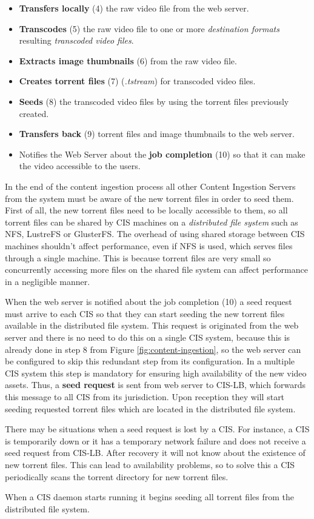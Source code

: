 \begin{itemize}
 \item \textbf{Transfers locally} (4) the raw video file from the web server.
 \item \textbf{Transcodes} (5) the raw video file to one or more \textit{destination formats} resulting \textit{transcoded video files}.
 \item \textbf{Extracts image thumbnails} (6) from the raw video file.
 \item \textbf{Creates torrent files} (7) (\textit{.tstream}) for transcoded video files.
 \item \textbf{Seeds} (8) the transcoded video files by using the torrent files previously created.
 \item \textbf{Transfers back} (9) torrent files and image thumbnails to the web server.
 \item Notifies the Web Server about the \textbf{job completion} (10) so that it can make the video accessible to the users.
\end{itemize}

In the end of the content ingestion process all other Content Ingestion Servers from the system must be aware of the new torrent files in order to seed them. First of all, the new torrent files need to be locally accessible to them, so all torrent files can be shared by CIS machines on a \textit{distributed file system} such as NFS, LustreFS or GlusterFS. The overhead of using shared storage between CIS machines shouldn't affect performance, even if NFS is used, which serves files through a single machine. This is because torrent files are very small so concurrently accessing more files on the shared file system can affect performance in a negligible manner.

When the web server is notified about the job completion (10) a seed request must arrive to each CIS so that they can start seeding the new torrent files available in the distributed file system. This request is originated from the web server and there is no need to do this on a single CIS system, because this is already done in step 8 from Figure \ref{fig:content-ingestion}, so the web server can be configured to skip this redundant step from its configuration. In a multiple CIS system this step is mandatory for ensuring high availability of the new video assets. Thus, a \textbf{seed request} is sent from web server to CIS-LB, which forwards this message to all CIS from its jurisdiction. Upon reception they will start seeding requested torrent files which are located in the distributed file system.

There may be situations when a seed request is lost by a CIS. For instance, a CIS is temporarily down or it has a temporary network failure and does not receive a seed request from CIS-LB. After recovery it will not know about the existence of new torrent files. This can lead to availability problems, so to solve this a CIS periodically scans the torrent directory for new torrent files.

When a CIS daemon starts running it begins seeding all torrent files from the distributed file system.